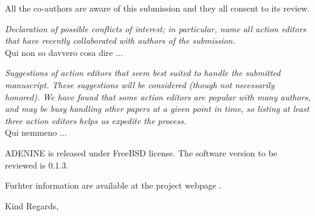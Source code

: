 \documentclass[11pt]{letter} %
\begin{document}
\begin{letter}
All the co-authors are aware of this submission and they all consent to its review.

\emph{Declaration of possible conflicts of interest; in particular, name all action editors that have recently collaborated with authors of the submission.}\\
Qui non so davvero cosa dire ...

\emph{Suggestions of action editors that seem best suited to handle the submitted manuscript. These suggestions will be considered (though not necessarily honored). We have found that some action editors are popular with many authors, and may be busy handling other papers at a given point in time, so listing at least three action editors helps us expedite the process.}\\
Qui nemmeno ...

{\sc ADENINE} is released under FreeBSD license. The software version to be reviewed is 0.1.3.

Furhter information are available at the project webpage .

\closing{Kind Regards,}




\end{letter}
\end{document}
